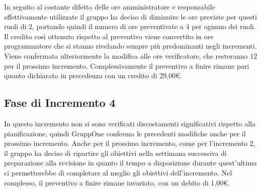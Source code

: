 \documentclass[../piano-di-progetto.tex]{subfiles}
\begin{document}
In seguito al costante difetto delle ore amministratore e responsabile effettivamente utilizzate il gruppo ha deciso di diminuire le ore previste per questi ruoli di 2, portando quindi il numero di ore preventivate a 4 per ognuno dei ruoli.
Il credito così ottenuto rispetto al preventivo viene convertito in ore programmatore che si stanno rivelando sempre più predominanti negli incrementi.
Viene confermata ulteriormente la modifica alle ore verificatore, che resteranno 12 per il prossimo incremento.
Complessivamente il preventivo a finire rimane pari quanto dichiarato in precedenza con un credito di 29,00€.



\subsection{Fase di Incremento 4}%
\label{sub:preventivo_a_finire/fase_di_incremento_4}

In questo incremento non si sono verificati discostamenti significativi rispetto alla pianificazione, quindi GruppOne conferma le precedenti modifiche anche per il prossimo incremento.
Anche per il prossimo incremento, come per l'incremento 2, il gruppo ha deciso di ripartire gli obiettivi nella settimana successiva di preparazione alla revisione in quanto il tempo a disposizione durante quest'ultima ci permetterebbe di completare al meglio gli obiettivi dell'incremento.
Nel complesso, il preventivo a finire rimane invariato, con un debito di 1,00€.


\end{document}

